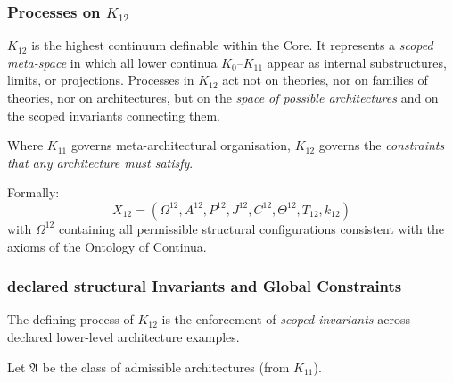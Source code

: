 

\subsubsection{Processes on $K_{12}$}
\label{sec:processes-k12}

$K_{12}$ is the highest continuum definable within the Core.  
It represents a \emph{scoped meta-space} in which all lower continua
$K_0$--$K_{11}$ appear as internal substructures, limits, or projections.
Processes in $K_{12}$ act not on theories, nor on families of theories,
nor on architectures, but on the \emph{space of possible architectures}
and on the scoped invariants connecting them.

Where $K_{11}$ governs meta-architectural organisation,  
$K_{12}$ governs the \emph{constraints that any architecture must satisfy}.

Formally:
\[
X_{12} = (\Omega^{12}, A^{12}, P^{12}, J^{12}, 
          C^{12}, \Theta^{12}, T_{12}, k_{12})
\]
with $\Omega^{12}$ containing all permissible structural configurations
consistent with the axioms of the Ontology of Continua.

\subsubsection{declared structural Invariants and Global Constraints}

The defining process of $K_{12}$ is the enforcement of
\emph{scoped invariants} across declared lower-level architecture examples.

Let $\mathfrak{A}$ be the class of admissible architectures 
(from $K_{11}$).

